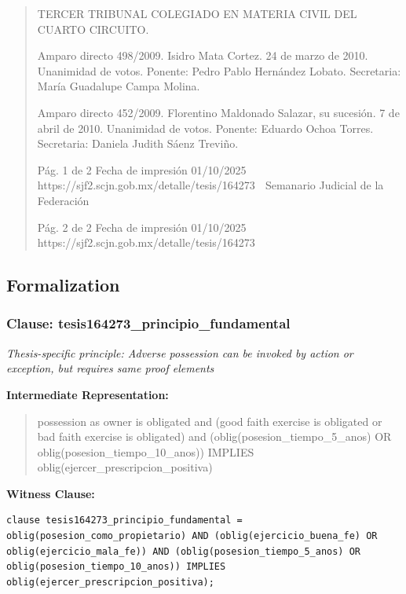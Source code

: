 \documentclass[11pt,a4paper]{article}
\begin{document}
\begin{quote}
TERCER TRIBUNAL COLEGIADO EN MATERIA CIVIL DEL CUARTO CIRCUITO.


Amparo directo 498/2009. Isidro Mata Cortez. 24 de marzo de 2010. Unanimidad de votos. Ponente:
Pedro Pablo Hernández Lobato. Secretaria: María Guadalupe Campa Molina.

Amparo directo 452/2009. Florentino Maldonado Salazar, su sucesión. 7 de abril de 2010.
Unanimidad de votos. Ponente: Eduardo Ochoa Torres. Secretaria: Daniela Judith Sáenz Treviño.




                                             Pág. 1 de 2           Fecha de impresión 01/10/2025
  https://sjf2.scjn.gob.mx/detalle/tesis/164273
                                                Semanario Judicial de la Federación




                                           Pág. 2 de 2       Fecha de impresión 01/10/2025
https://sjf2.scjn.gob.mx/detalle/tesis/164273

\end{quote}

\subsection{Formalization}

\subsubsection{Clause: tesis164273\_principio\_fundamental}

\textit{Thesis-specific principle: Adverse possession can be invoked by action or exception, but requires same proof elements}

\textbf{Intermediate Representation:}

\begin{quote}
possession as owner is obligated and (good faith exercise is obligated or bad faith exercise is obligated) and (oblig(posesion\_tiempo\_5\_anos) OR oblig(posesion\_tiempo\_10\_anos)) IMPLIES oblig(ejercer\_prescripcion\_positiva)
\end{quote}

\textbf{Witness Clause:}

\begin{lstlisting}[style=witnessstyle, language=Witness]
clause tesis164273_principio_fundamental = oblig(posesion_como_propietario) AND (oblig(ejercicio_buena_fe) OR oblig(ejercicio_mala_fe)) AND (oblig(posesion_tiempo_5_anos) OR oblig(posesion_tiempo_10_anos)) IMPLIES oblig(ejercer_prescripcion_positiva);
\end{lstlisting}
\end{document}
